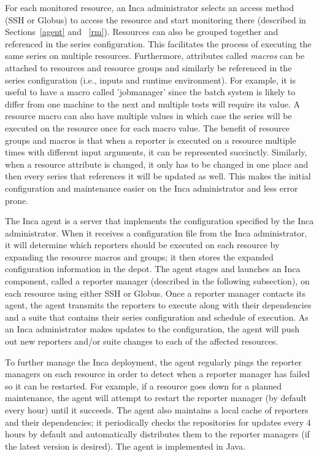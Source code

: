 \documentclass[times,10pt,twocolumn]{article}
\begin{document}
For each monitored resource, an Inca administrator selects an access method
(SSH or Globus) to access the resource and start monitoring there (described
in Sections~\ref{agent} and ~\ref{rm}).  Resources can also be grouped
together and referenced in the series configuration.  This facilitates the
process of executing the same series on multiple resources.  Furthermore,
attributes called \emph{macros} can be attached to resources and resource
groups and similarly be referenced in the series configuration (i.e., inputs
and runtime environment).  For example, it is useful to have a macro called
'jobmanager' since the batch system is likely to differ from one machine to
the next and multiple tests will require its value.  A resource macro can also
have multiple values in which case the series will be executed on the resource
once for each macro value.  The
benefit of resource groups and macros is that when a reporter is executed on a
resource multiple times with different input arguments, it can be represented
succinctly.  Similarly, when a resource attribute is changed, it only has to be
changed in one place and then every series that references it will be updated
as well.  This makes the initial configuration and maintenance easier on the
Inca administrator and less error prone.

\label{agent}

The Inca agent is a server that implements the configuration specified by the
Inca administrator.  When it receives a configuration file from the Inca
administrator, it will determine which reporters should be executed on each
resource by expanding the resource macros and groups; it then stores the
expanded configuration information in the depot.  The agent stages and
launches an Inca component, called a reporter manager (described in the
following subsection), on each resource using either SSH or Globus.  Once a
reporter manager contacts its agent, the agent transmits the reporters to
execute along with their dependencies and a suite that contains their series
configuration and schedule of execution.  As an Inca administrator makes
updates to the configuration, the agent will push out new reporters and/or
suite changes to each of the affected resources.

To further manage the Inca deployment, the agent regularly pings the reporter
managers on each resource in order to detect when a reporter manager has
failed so it can be restarted.  For example, if a resource goes down for a
planned maintenance, the agent will attempt to restart the reporter manager
(by default every hour) until it succeeds.  The agent also maintains a local
cache of reporters and their dependencies; it periodically checks the
repositories for updates every 4 hours by default and automatically
distributes them to the reporter managers (if the latest version is desired).  
The agent is implemented in Java. 
\end{document}
